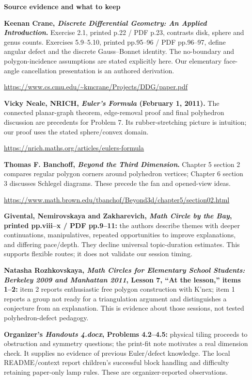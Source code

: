 \documentclass[11pt,letterpaper]{article}
\newcommand{\titleline}[1]{\par{\Large\bfseries #1}\par\vspace{4pt}}
\newcommand{\sub}[1]{\par\vspace{3pt}{\bfseries #1}\par}
\begin{document}
\newpage
\titleline{Source evidence and what to keep}
\sub{Mathematical precedents}
\textbf{Keenan Crane, \emph{Discrete Differential Geometry: An Applied Introduction}.} Exercise 2.1, printed p.22 / PDF p.23, contrasts disk, sphere and genus counts. Exercises 5.9--5.10, printed pp.95--96 / PDF pp.96--97, define angular defect and the discrete Gauss--Bonnet identity. The no-boundary and polygon-incidence assumptions are stated explicitly here. Our elementary face-angle cancellation presentation is an authored derivation.\par
\url{https://www.cs.cmu.edu/~kmcrane/Projects/DDG/paper.pdf}

\textbf{Vicky Neale, NRICH, \emph{Euler's Formula} (February 1, 2011).} The connected planar-graph theorem, edge-removal proof and final polyhedron discussion are precedents for Problem 7. Its rubber-stretching picture is intuition; our proof uses the stated sphere/convex domain.\par
\url{https://nrich.maths.org/articles/eulers-formula}

\textbf{Thomas F. Banchoff, \emph{Beyond the Third Dimension}.} Chapter 5 section 2 compares regular polygon corners around polyhedron vertices; Chapter 6 section 3 discusses Schlegel diagrams. These precede the fan and opened-view ideas.\par
\url{https://www.math.brown.edu/tbanchof/Beyond3d/chapter5/section02.html}

\sub{Teaching evidence, and our adaptation}
\textbf{Givental, Nemirovskaya and Zakharevich, \emph{Math Circle by the Bay}, printed pp.viii--x / PDF pp.9--11:} the authors describe themes with deeper continuations, manipulatives, repeated opportunities to improve explanations, and differing pace/depth. They decline universal topic-duration estimates. This supports flexible routes; it does not validate our session timing.

\textbf{Natasha Rozhkovskaya, \emph{Math Circles for Elementary School Students: Berkeley 2009 and Manhattan 2011}, Lesson 7, ``At the lesson,'' items 1--2:} item 2 reports enthusiastic free polygon construction with K'nex; item 1 reports a group not ready for a triangulation argument and distinguishes a conjecture from an explanation. This is evidence about those sessions, not tested polyhedron-defect pedagogy.

\textbf{Organizer's \emph{Handouts 4.docx}, Problems 4.2--4.5:} physical tiling proceeds to obstruction and symmetry questions; the print-fit note motivates a real dimension check. It supplies no evidence of previous Euler/defect knowledge. The local README/context report children's successful block handling and difficulty retaining paper-only lamp rules. These are organizer-reported observations.
\end{document}
